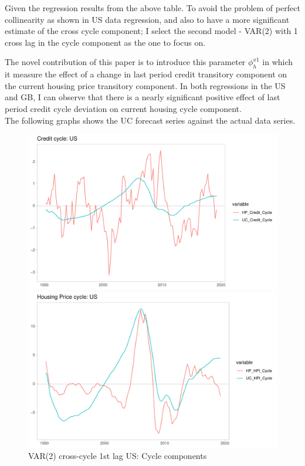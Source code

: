 \documentclass[fleqn]{article}
\begin{document}
\begin{outline}[enumerate]
\begin{landscape}
\begin{table}[]
			\end{table}
			
		\end{landscape}
		
		\clearpage
		
		Given the regression results from the above table. To avoid the problem of perfect collinearity as shown in US data regression, and also to have a more significant estimate of the cross cycle component; I select the second model - VAR(2) with 1 cross lag in the cycle component as the one to focus on.
		
		The novel contribution of this paper is to introduce this parameter $\phi^{x1}_h$ in which it measure the effect of a change in last period credit transitory component on the current housing price transitory component. In both regressions in the US and GB, I can observe that there is a nearly significant positive effect of last period credit cycle deviation on current housing cycle component.
		\\
		
		The following graphs shows the UC forecast series against the actual data series.
		
		\begin{figure}[h!]
			\caption{VAR(2) cross-cycle 1st lag US: Cycle components}	
			\centerline{\includegraphics[scale=0.7]{../../Regression/VAR_2_crosscycle_1stlagonly/Output/Graphs/Credit_cycle_US.pdf}}
			\centerline{\includegraphics[scale=0.7]{../../Regression/VAR_2_crosscycle_1stlagonly/Output/Graphs/HP_Cycle_US.pdf}}
		\end{figure}
		

\end{outline}
\end{document}
